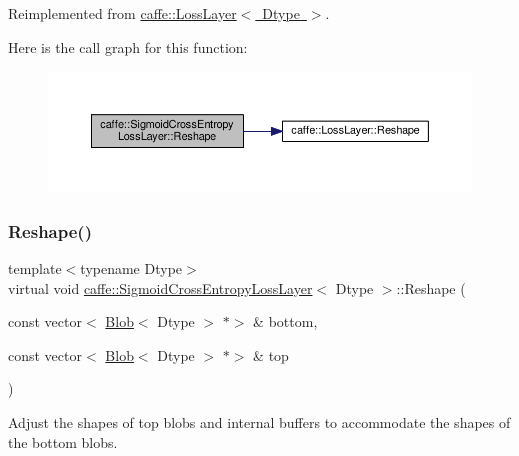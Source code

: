 Reimplemented from \mbox{\hyperlink{classcaffe_1_1_loss_layer_abf00412194f5413ea9468ee44b0d986f}{caffe\+::\+Loss\+Layer$<$ Dtype $>$}}.

Here is the call graph for this function\+:
\nopagebreak
\begin{figure}[H]
\begin{center}
\leavevmode
\includegraphics[width=350pt]{classcaffe_1_1_sigmoid_cross_entropy_loss_layer_a305423abeea4bd1652ff7e696aaba808_cgraph}
\end{center}
\end{figure}
\mbox{\label{classcaffe_1_1_sigmoid_cross_entropy_loss_layer_a4199eb0668451022f8da20ebca129eb3}} 
\subsubsection{\texorpdfstring{Reshape()}{Reshape()}\hspace{0.1cm}{\footnotesize\ttfamily [2/2]}}
{\footnotesize\ttfamily template$<$typename Dtype$>$ \\
virtual void \mbox{\hyperlink{classcaffe_1_1_sigmoid_cross_entropy_loss_layer}{caffe\+::\+Sigmoid\+Cross\+Entropy\+Loss\+Layer}}$<$ Dtype $>$\+::Reshape (\begin{DoxyParamCaption}\item[{const vector$<$ \mbox{\hyperlink{classcaffe_1_1_blob}{Blob}}$<$ Dtype $>$ $\ast$$>$ \&}]{bottom,  }\item[{const vector$<$ \mbox{\hyperlink{classcaffe_1_1_blob}{Blob}}$<$ Dtype $>$ $\ast$$>$ \&}]{top }\end{DoxyParamCaption})\hspace{0.3cm}{\ttfamily [virtual]}}



Adjust the shapes of top blobs and internal buffers to accommodate the shapes of the bottom blobs. 


